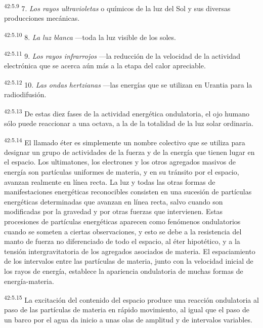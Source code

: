 \par
\textsuperscript{42:5.9} 7. \textit{Los rayos ultravioletas} o químicos de la luz del Sol y sus diversas producciones mecánicas.

\par
\textsuperscript{42:5.10} 8. \textit{La luz blanca} ---toda la luz visible de los soles.

\par
\textsuperscript{42:5.11} 9. \textit{Los rayos infrarrojos} ---la reducción de la velocidad de la actividad electrónica que se acerca aún más a la etapa del calor apreciable.

\par
\textsuperscript{42:5.12} 10. \textit{Las ondas hertzianas} ---las energías que se utilizan en Urantia para la radiodifusión.

\par
\textsuperscript{42:5.13} De estas diez fases de la actividad energética ondulatoria, el ojo humano sólo puede reaccionar a una octava, a la de la totalidad de la luz solar ordinaria.

\par
\textsuperscript{42:5.14} El llamado éter es simplemente un nombre colectivo que se utiliza para designar un grupo de actividades de la fuerza y de la energía que tienen lugar en el espacio. Los ultimatones, los electrones y los otros agregados masivos de energía son partículas uniformes de materia, y en su tránsito por el espacio, avanzan realmente en línea recta. La luz y todas las otras formas de manifestaciones energéticas reconocibles consisten en una sucesión de partículas energéticas determinadas que avanzan en línea recta, salvo cuando son modificadas por la gravedad y por otras fuerzas que intervienen. Estas procesiones de partículas energéticas aparecen como fenómenos ondulatorios cuando se someten a ciertas observaciones, y esto se debe a la resistencia del manto de fuerza no diferenciado de todo el espacio, al éter hipotético, y a la tensión intergravitatoria de los agregados asociados de materia. El espaciamiento de los intervalos entre las partículas de materia, junto con la velocidad inicial de los rayos de energía, establece la apariencia ondulatoria de muchas formas de energía-materia.

\par
\textsuperscript{42:5.15} La excitación del contenido del espacio produce una reacción ondulatoria al paso de las partículas de materia en rápido movimiento, al igual que el paso de un barco por el agua da inicio a unas olas de amplitud y de intervalos variables.

